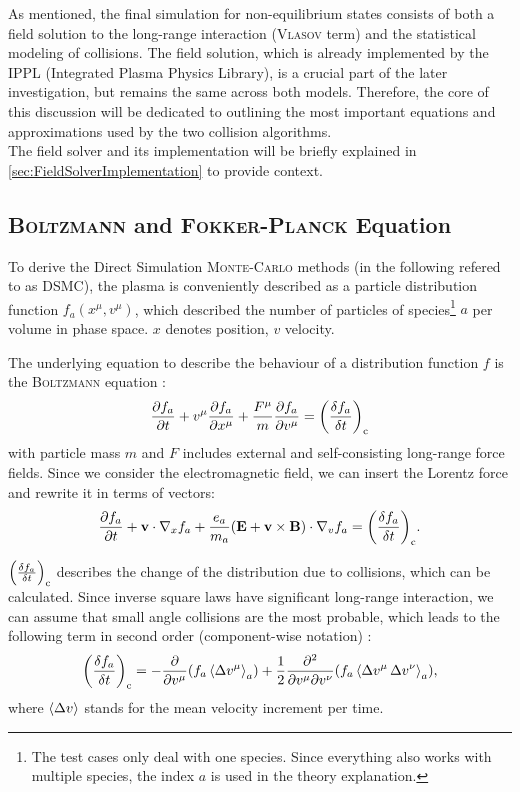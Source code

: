 As mentioned, the final simulation for non-equilibrium states consists of both a field solution to the long-range interaction (\textsc{Vlasov} term) and the statistical modeling of collisions. The field solution, which is already implemented by the IPPL (Integrated Plasma Physics Library), is a crucial part of the later investigation, but remains the same across both models. Therefore, the core of this discussion will be dedicated to outlining the most important equations and approximations used by the two collision algorithms. \\
The field solver and its implementation will be briefly explained in \ref{sec:FieldSolverImplementation} to provide context. 


\subsection{\textsc{Boltzmann} and \textsc{Fokker-Planck} Equation}

To derive the Direct Simulation \textsc{Monte-Carlo} methods (in the following refered to as DSMC), the plasma is conveniently described as a particle distribution function $f_a(x^\mu, v^\mu)$, which described the number of particles of species\footnote{The test cases only deal with one species. Since everything also works with multiple species, the index $a$ is used in the theory explanation.} $a$ per volume in phase space. $x$ denotes position, $v$ velocity.

The underlying equation to describe the behaviour of a distribution function $f$ is the \textsc{Boltzmann} equation \cite[1]{Rosenbluth1957}:
\begin{equation*}
    \pdv{f_a}{t} + v^\mu \pdv{f_a}{x^\mu} + \frac{F^\mu}{m} \pdv{f_a}{v^\mu} = \qty(\fdv{f_a}{t})_\mathrm{c}
\end{equation*}
with particle mass $m$ and $F$ includes external and self-consisting long-range force fields. Since we consider the electromagnetic field, we can insert the Lorentz force and rewrite it in terms of vectors:
\begin{equation*}
    \pdv{f_a}{t} + \mathbf{v} \cdot \nabla_x f_a + \frac{e_a}{m_a} \qty(\mathbf{E} + \mathbf{v} \times \mathbf{B}) \cdot \nabla_v f_a = \qty(\fdv{f_a}{t})_\mathrm{c} .
\end{equation*}

$\qty(\fdv{f_a}{t})_\mathrm{c}$ describes the change of the distribution due to collisions, which can be calculated. Since inverse square laws have significant long-range interaction, we can assume that small angle collisions are the most probable, which leads to the following term in second order (component-wise notation) \cite[2]{Rosenbluth1957}:
\begin{equation}
    \qty(\fdv{f_a}{t})_\mathrm{c} = - \pdv{v^\mu} \qty(f_a \expval{\Delta v^\mu}_a) + \frac{1}{2} \pdv{}{v^\mu}{v^\nu} \qty(f_a \expval{\Delta v^\mu \, \Delta v^\nu}_a) , \label{eq:2.1:fokkerplanck_base}
\end{equation}
where $\expval{\Delta v}$ stands for the mean velocity increment per time.

